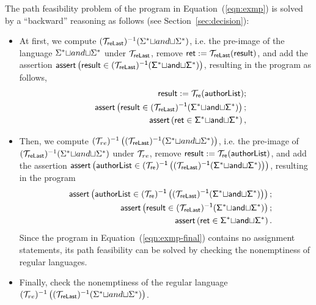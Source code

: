 The path feasibility problem of the program in Equation~(\ref{eqn:exmp}) is solved by a ``backward'' reasoning as follows (see Section~\ref{sec:decision}):  
\begin{itemize}
\item At first, we compute $(\mathcal{T}_{\sf reLast})^{-1}(\Sigma^*{\small\sqcup} and{\small\sqcup} \Sigma^*)$,  i.e. the pre-image of the language $\Sigma^*{\small\sqcup} and{\small\sqcup} \Sigma^*$ under $\mathcal{T}_{\sf reLast}$,  remove $\sf  ret : = \mathcal{T}_{reLast}(result)$, and add the assertion $\textsf{assert}\left(\sf result \in (\mathcal{T}_{\sf reLast})^{-1}(\Sigma^*{\small\sqcup} and{\small\sqcup} \Sigma^*)\right)$, resulting in the program as follows,
\begin{eqnarray}
& & \sf result  := \sf  \mathcal{T}_{ re}(authorList); \nonumber\\
& & \textsf{assert}\left(\sf result \in (\mathcal{T}_{\sf reLast})^{-1}(\Sigma^*{\small\sqcup} and{\small\sqcup} \Sigma^*)\right); \nonumber\\
& & \sf \textsf{assert}\left(ret \in \Sigma^*{\small\sqcup} and{\small\sqcup} \Sigma^*\right),
\end{eqnarray}

%
\item Then, we compute $(\mathcal{T}_{ re})^{-1}\left((\mathcal{T}_{\sf reLast})^{-1}(\Sigma^*{\small\sqcup} and{\small\sqcup} \Sigma^*)\right)$, i.e. the pre-image of $(\mathcal{T}_{\sf reLast})^{-1}(\Sigma^*{\small\sqcup} and{\small\sqcup} \Sigma^*)$ under $\mathcal{T}_{ re}$, remove $ \sf result  := \sf  \mathcal{T}_{ re}(authorList)$, and add the assertion $\textsf{assert}\left(\sf authorList \in (\mathcal{T}_{ re})^{-1}\left((\mathcal{T}_{\sf reLast})^{-1}(\Sigma^*{\small\sqcup} and{\small\sqcup} \Sigma^*)\right)\right)$, resulting in the program 
\begin{eqnarray}\label{eqn:exmp-final}
& & \textsf{assert}\left(\sf authorList \in (\mathcal{T}_{ re})^{-1}\left((\mathcal{T}_{\sf reLast})^{-1}(\Sigma^*{\small\sqcup} and{\small\sqcup} \Sigma^*)\right)\right); \nonumber\\
& & \textsf{assert}\left(\sf result \in (\mathcal{T}_{\sf reLast})^{-1}(\Sigma^*{\small\sqcup} and{\small\sqcup} \Sigma^*)\right); \nonumber\\
& & \sf \textsf{assert}\left(ret \in \Sigma^*{\small\sqcup} and{\small\sqcup} \Sigma^*\right).
\end{eqnarray}
Since the program in Equation~(\ref{eqn:exmp-final}) contains no assignment statements, its path feasibility can be solved by checking the nonemptiness of regular languages.
\item Finally, check the nonemptiness of the regular language $(\mathcal{T}_{ re})^{-1}\left((\mathcal{T}_{\sf reLast})^{-1}(\Sigma^*{\small\sqcup} and{\small\sqcup} \Sigma^*)\right)$.
\end{itemize}

